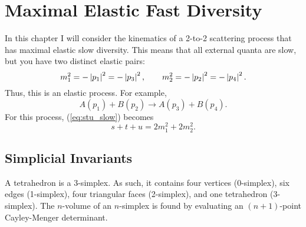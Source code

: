 \chapter{Maximal Elastic Fast Diversity}
In this chapter I will consider the kinematics of a 2-to-2 scattering process that has maximal elastic slow diversity. This means that all external quanta are slow, but you have two distinct elastic pairs:
\begin{equation}
	m_{1}^{2} = -\left\lvert p_{1} \right\rvert^{2} = -\left\lvert p_{3} \right\rvert^{2}, \qquad m_{2}^{2} = -\left\lvert p_{2} \right\rvert^{2} = -\left\lvert p_{4} \right\rvert^{2}.
\end{equation}
Thus, this is an elastic process. For example,
\begin{equation}
	A(p_{1}) + B(p_{2}) \longrightarrow A(p_{3}) + B(p_{4}).
\end{equation}
For this process, (\ref{eq:stu_slow}) becomes
\begin{equation}
	s + t + u = 2m_{1}^{2} + 2m_{2}^{2}.
\end{equation}
\section{Simplicial Invariants}
A tetrahedron is a 3-simplex. As such, it contains four vertices (0-simplex), six edges (1-simplex), four triangular faces (2-simplex), and one tetrahedron (3-simplex). The $n$-volume of an $n$-simplex is found by evaluating an $(n+1)$-point Cayley-Menger determinant. 
